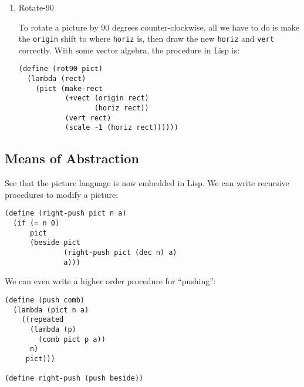 \documentclass[9pt]{report}
\begin{document}
\begin{enumerate}
\begin{verbatim}
(define (beside p1 p2 a)
  (lambda (rect)
    (p1 (make-rect
         (origin rect)
         (scale a (horiz rect))
         (vert rect)))
    (p2 (make-rect
         (+vect (origin rect)
                (scale a (horiz rect)))
         (scale (-1 a) (horiz rect))
         (vert rect)))))
\end{verbatim}

\item Rotate-90
\label{sec:orgf9f7ee4}

To rotate a picture by 90 degrees counter-clockwise, all we have
to do is make the \texttt{origin} shift to where \texttt{horiz} is, then draw
the new \texttt{horiz} and \texttt{vert} correctly. With some vector algebra,
the procedure in Lisp is:

\begin{verbatim}
(define (rot90 pict)
  (lambda (rect)
    (pict (make-rect
           (+vect (origin rect)
                  (horiz rect))
           (vert rect)
           (scale -1 (horiz rect))))))
\end{verbatim}
\end{enumerate}


\subsection{Means of Abstraction}
\label{sec:org74c9dcc}
See that the picture language is now embedded in Lisp. We can
write recursive procedures to modify a picture:

\begin{verbatim}
(define (right-push pict n a)
  (if (= n 0)
      pict
      (beside pict
              (right-push pict (dec n) a)
              a)))
\end{verbatim}

We can even write a higher order procedure for ``pushing'':
\begin{verbatim}
(define (push comb)
  (lambda (pict n a)
    ((repeated
      (lambda (p)
        (comb pict p a))
      n)
     pict)))

(define right-push (push beside))
\end{verbatim}
\end{document}
